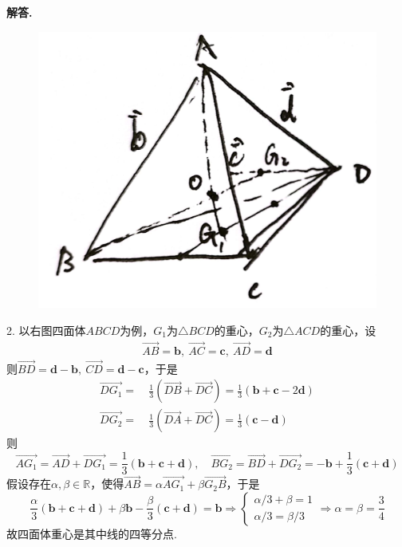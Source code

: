 \documentclass[12pt, a4paper, oneside]{ctexart}
\newenvironment{solution}[1][]{\par\noindent\textbf{#1解答. }}{\smallskip\par}  %
\def\bd{\boldsymbol}        %
\def\R{\mathbb{R}}          %
\begin{document}
\begin{solution}
\begin{figure} %
    \centering
    \includegraphics[scale=0.13]{微分几何第一次作业2.jpg} %
\end{figure}
2. 以右图四面体$ABCD$为例，$G_1$为$\triangle BCD$的重心，$G_2$为$\triangle ACD$的重心，设
\begin{align*}
    \overrightarrow{AB} = \bd{b},\ \overrightarrow{AC} = \bd{c},\ \overrightarrow{AD} = \bd{d}
\end{align*}
则$\overrightarrow{BD} = \bd{d} - \bd{b},\ \overrightarrow{CD} = \bd{d} - \bd{c}$，于是
\begin{align*}
    \overrightarrow{DG_1} =&\ \frac{1}{3}(\overrightarrow{DB}+\overrightarrow{DC}) = \frac{1}{3}(\bd{b}+\bd{c}-2\bd{d})\\
    \overrightarrow{DG_2} =&\ \frac{1}{3}(\overrightarrow{DA}+\overrightarrow{DC}) = \frac{1}{3}(\bd{c}-\bd{d})
\end{align*}
则
\begin{equation*}
    \overrightarrow{AG_1} = \overrightarrow{AD} + \overrightarrow{DG_1} = \frac{1}{3}(\bd{b}+\bd{c}+\bd{d}),\quad
    \overrightarrow{BG_2} = \overrightarrow{BD}+\overrightarrow{DG_2} = -\bd{b}+\frac{1}{3}(\bd{c}+\bd{d})
\end{equation*}
假设存在$\alpha,\beta\in\R$，使得$\overrightarrow{AB} = \alpha\overrightarrow{AG_1} + \beta\overrightarrow{G_2B}$，于是
\begin{equation*}
    \frac{\alpha}{3}(\bd{b}+\bd{c}+\bd{d})  + \beta\bd{b} - \frac{\beta}{3}(\bd{c}+\bd{d}) = \bd{b}
    \Rightarrow \begin{cases}
        \alpha/3 + \beta = 1\\
        \alpha/3 = \beta/3
    \end{cases}\Rightarrow\alpha = \beta = \frac{3}{4}
\end{equation*}
故四面体重心是其中线的四等分点.


\end{solution}
\end{document}
